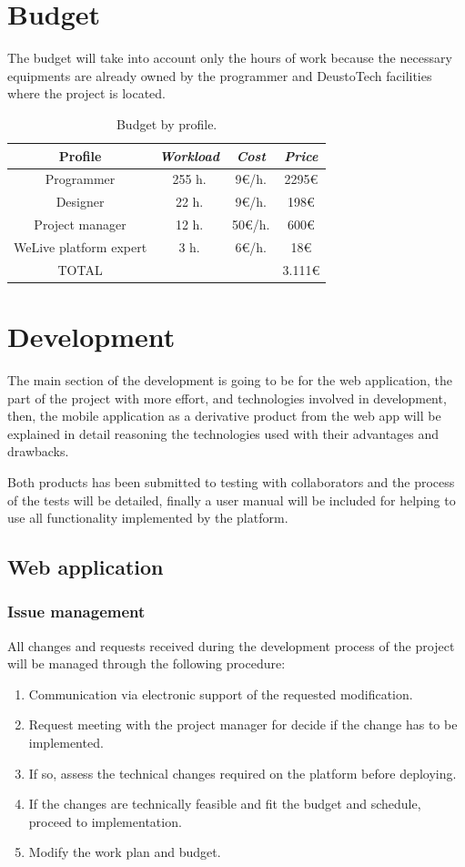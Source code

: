 \documentclass{DeustoFDP}
\begin{document}
\chapter{Budget}
The budget will take into account only the hours of work because the necessary equipments are already owned by the programmer and DeustoTech facilities where the project is located.

\begin{table}[H]
	\centering
	\caption{Budget by profile.}\label{tab:budgetprofile}
	\begin{tabular}{cccc}
		\toprule
		\textbf{Profile} & \emph{Workload} & \emph{Cost} & \emph{Price}\\
		\midrule
		Programmer  & 255 h.     & 9€/h. & 2295€ \\
		Designer   & 22 h.     & 9€/h. & 198€ \\
		Project manager & 12 h.     & 50€/h.  & 600€ \\
		WeLive platform expert & 3 h.     & 6€/h. & 18€ \\
		TOTAL & & & 3.111€\\
		\bottomrule
	\end{tabular}
\end{table}

\chapter{Development}
The main section of the development is going to be for the web application, the part of the project with more effort, and technologies involved in development, then, the mobile application as a derivative product from the web app will be explained in detail reasoning the technologies used with their advantages and drawbacks.

Both products has been submitted to testing with collaborators and the process of the tests will be detailed, finally a user manual will be included for helping to use all functionality implemented by the platform.
\section{Web application}
\subsection{Issue management}
All changes and requests received during the development process of the project will be managed through the following procedure:
\begin{enumerate}
	\item Communication via electronic support of the requested modification.
	\item Request meeting with the project manager for decide if the change has to be implemented.
	\item If so, assess the technical changes required on the platform before deploying.
	\item If the changes are technically feasible and fit the budget and schedule, proceed to implementation.
	\item Modify the work plan and budget.
\end{enumerate}
\end{document}
